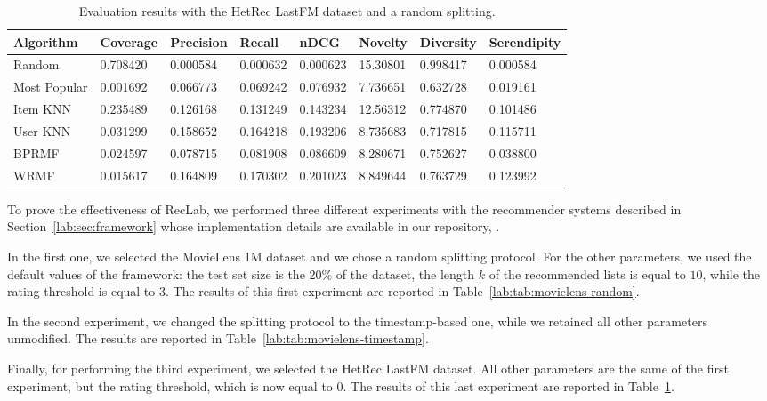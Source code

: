 \begin{table}
\centering
\begin{tabular}{@{}llllllll@{}}
\toprule
Algorithm    & Coverage & Precision & Recall   & nDCG     & Novelty  & Diversity & Serendipity \\ \midrule
Random       & 0.708420 & 0.000584  & 0.000632 & 0.000623 & 15.30801 & 0.998417  & 0.000584    \\
Most Popular & 0.001692 & 0.066773  & 0.069242 & 0.076932 & 7.736651 & 0.632728  & 0.019161    \\
Item KNN     & 0.235489 & 0.126168  & 0.131249 & 0.143234 & 12.56312 & 0.774870  & 0.101486    \\
User KNN     & 0.031299 & 0.158652  & 0.164218 & 0.193206 & 8.735683 & 0.717815  & 0.115711    \\
BPRMF        & 0.024597 & 0.078715  & 0.081908 & 0.086609 & 8.280671 & 0.752627  & 0.038800    \\
WRMF         & 0.015617 & 0.164809  & 0.170302 & 0.201023 & 8.849644 & 0.763729  & 0.123992    \\ \bottomrule
\end{tabular}
\caption[Evaluation with LastFM and random splitting]{Evaluation results with the HetRec LastFM dataset and a random splitting.}
\label{lab:tab:lastfm}
\end{table}

To prove the effectiveness of RecLab, we performed three different experiments with the recommender systems described in Section~\ref{lab:sec:framework} whose implementation details are available in our repository, .

In the first one, we selected the MovieLens 1M dataset and we chose a random splitting protocol. For the other parameters, we used the default values of the framework: the test set size is the 20\% of the dataset, the length $k$ of the recommended lists is equal to $10$, while the rating threshold is equal to $3$. The results of this first experiment are reported in Table~\ref{lab:tab:movielens-random}.

In the second experiment, we changed the splitting protocol to the timestamp-based one, while we retained all other parameters unmodified. The results are reported in Table~\ref{lab:tab:movielens-timestamp}.

Finally, for performing the third experiment, we selected the HetRec LastFM dataset. All other parameters are the same of the first experiment, but the rating threshold, which is now equal to $0$. The results of this last experiment are reported in Table~\ref{lab:tab:lastfm}.

